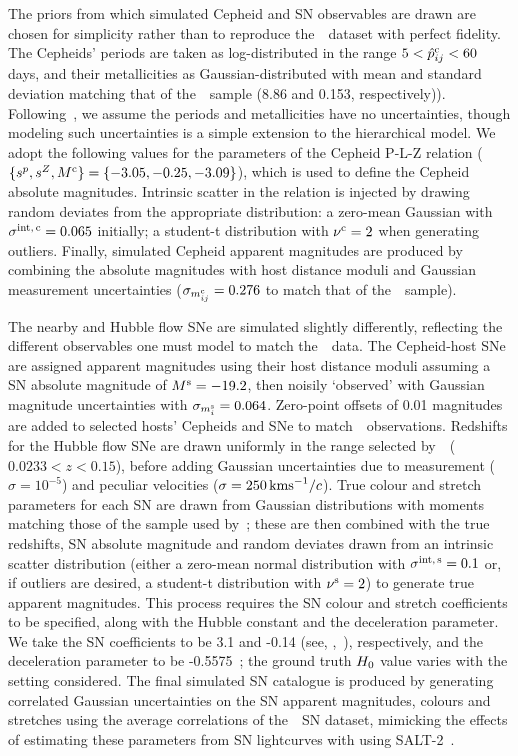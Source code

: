 \documentclass[a4paper,fleqn,usenatbib]{mnras}
\newcommand{\riess}{\citetalias{Riess_etal:2016}}
\newcommand{\slopep}{\ensuremath{s^p}}
\newcommand{\slopeZ}{\ensuremath{s^Z}}
\newcommand{\Mstdc}{\ensuremath{M^{\rm c}}}
\newcommand{\sigintc}{\ensuremath{\sigma^{\rm int,\,c}}}
\newcommand{\mc}{\ensuremath{m_{ij}^{\rm c}}}
\newcommand{\phatc}{\ensuremath{\hat{p}_{ij}^{\rm c}}}
\newcommand{\Mstds}{\ensuremath{M^{\rm s}}}
\newcommand{\sigints}{\ensuremath{\sigma^{\rm int,\,s}}}
\newcommand{\msup}{\ensuremath{m_i^{\rm s}}}
\newcommand{\dofc}{\ensuremath{\nu^{\rm c}}}
\newcommand{\dofs}{\ensuremath{\nu^{\rm s}}}
\begin{document}
{The priors from which simulated Cepheid and SN observables are drawn are chosen for simplicity rather than to reproduce the~\riess\ dataset with perfect fidelity. The Cepheids' periods are taken as log-distributed in the range $5 < \phatc < 60$ days, and their metallicities as Gaussian-distributed with mean and standard deviation matching that of the~\riess\ sample (8.86 and 0.153, respectively)). Following~\riess, we assume the periods and metallicities have no uncertainties, though modeling such uncertainties is a simple extension to the hierarchical model. We adopt the following values for the parameters of the Cepheid P-L-Z relation ($\{\slopep,\slopeZ,\Mstdc\} = \{-3.05, -0.25, -3.09\}$), which is used to define the Cepheid absolute magnitudes. Intrinsic scatter in the relation is injected by drawing random deviates from the appropriate distribution: a zero-mean Gaussian with $\sigintc = 0.065$ initially; a student-t distribution with $\dofc=2$ when generating outliers. Finally, simulated Cepheid apparent magnitudes are produced by combining the absolute magnitudes with host distance moduli and Gaussian measurement uncertainties ($\sigma_{\mc} = 0.276$ to match that of the~\riess\ sample).

The nearby and Hubble flow SNe are simulated slightly differently, reflecting the different observables one must model to match the~\riess\ data. The Cepheid-host SNe are assigned apparent magnitudes using their host distance moduli assuming a SN absolute magnitude of $\Mstds = -19.2$, then noisily `observed' with Gaussian magnitude uncertainties with $\sigma_{\msup} = 0.064$. Zero-point offsets of 0.01 magnitudes are added to selected hosts' Cepheids and SNe to match~\riess\ observations. Redshifts for the Hubble flow SNe are drawn uniformly in the range selected by~\riess\ ($0.0233 < z < 0.15$), before adding Gaussian uncertainties due to measurement ($\sigma=10^{-5}$) and peculiar velocities ($\sigma=250\,{\rm km s}^{-1}/ c$). True colour and stretch parameters for each SN are drawn from Gaussian distributions with moments matching those of the sample used by~\riess; these are then combined with the true redshifts, SN absolute magnitude and random deviates drawn from an intrinsic scatter distribution (either a zero-mean normal distribution with $\sigints = 0.1$ or, if outliers are desired, a student-t distribution with $\dofs=2$) to generate true apparent magnitudes. This process requires the SN colour and stretch coefficients to be specified, along with the Hubble constant and the deceleration parameter. We take the SN coefficients to be 3.1 and -0.14 (see, \eg,~\citealt{Scolnic_Kessler:2016}), respectively, and the deceleration parameter to be -0.5575~\citep{Betoule_etal:2014}; the ground truth $H_0$ value varies with the setting considered. The final simulated SN catalogue is produced by generating correlated Gaussian uncertainties on the SN apparent magnitudes, colours and stretches using the average correlations of the~\riess\ SN dataset, mimicking the effects of estimating these parameters from SN lightcurves with using SALT-2~\citep{Guy_etal:2007}.

}
\end{document}
